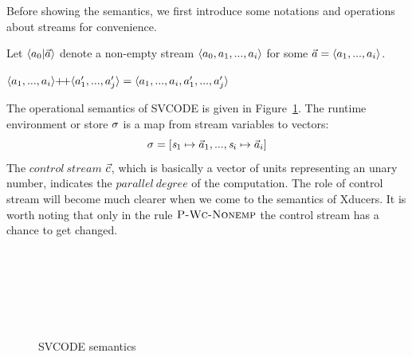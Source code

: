 Before showing the semantics, we first introduce some notations and operations about streams for convenience.
\begin{nota}
	Let $\< a_0 | \a \'>$ denote a non-empty stream $\< a_0,a_1,...,a_i \'>$ for some $\a = \< a_1,...,a_i \'>$. 
\end{nota}


\begin{nota}
$\vapp{\vrange{a_1}{a_i}} {\vrange{a_1'}{a_j'}} = \langle a_1,...,a_i,a_1',...,a_j' \rangle $ \\
	
\end{nota}

The operational semantics of SVCODE is given in Figure~\ref{fig-svcode-semantics}.
The runtime environment or store $\sigma$ is a map from stream variables to vectors:
 $$\sgm = [\s_1 \|-> {\a_1},...,\s_i \|-> {\a_i}]$$
The $control \ stream$ $\vec c$, which is basically a vector of units representing an unary number, indicates the $parallel \ degree$ of the computation. The role of control stream will become much clearer when we come to the semantics of Xducers. It is worth noting that only in the rule $\textsc{P-Wc-Nonemp}$ the control stream has a chance to get changed.

	
\begin{figure}[!h]\large 

\\


 \\[2ex]

 \\[4ex]

\\[2ex]
\\[4ex]


\caption{SVCODE semantics}
\label{fig-svcode-semantics}
\end{figure}

